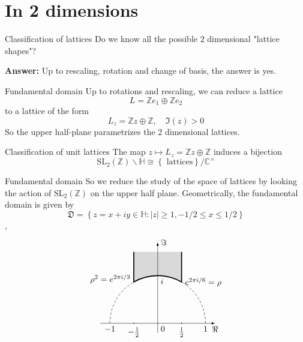 \documentclass[pdf]{beamer}
\begin{document}
\section{In 2 dimensions}
\begin{frame}{Classification of lattices}
    Do we know all the possible 2 dimensional "lattice shapes"?\vspace{3em}

    \pause
    \textbf{Answer:} Up to rescaling, rotation and change of basis, the answer is yes.
\end{frame}
\begin{frame}{Fundamental domain}
    Up to rotations and rescaling, we can reduce a lattice
    \[L = \mathbb{Z}e_1 \oplus \mathbb{Z}e_2\]
    to a lattice of the form
    \[L_z = \mathbb{Z}z\oplus\mathbb{Z}, \quad \Im(z)>0\]
    So the upper half-plane parametrizes the 2 dimensional lattices.
    \begin{block}{Classification of unit lattices}
        The map $z \mapsto L_z = \mathbb{Z}z\oplus\mathbb{Z}$ induces a bijection
        \[\text{SL}_2(\mathbb{Z}) \backslash\mathbb{H} \cong \left\lbrace \text{ lattices}\right\rbrace/\mathbb{C^\times}\]
    \end{block}

\end{frame}
\begin{frame}{Fundamental domain}
    So we reduce the study of the space of lattices by looking the action of $\text{SL}_2(\mathbb{Z})$ on the upper half plane. Geometrically, the fundamental domain is given by
    \[\mathfrak{D} = \left\lbrace z=x+iy \in \mathbb{H}: |z| \ge 1,-1/2 \le x \le 1/2 \right\rbrace \],
    \pause
    \[
        \begin{tikzpicture}[scale=2]
            \draw[densely dashed] (1,0) arc (0:60:1) (-1,0) arc (180:120:1);
            \draw[very thick, fill=gray!30] (.5,1.5) --node[right, pos=1]{$e^{2\pi i/6}=\rho$} (60:1) arc (60:120:1)
            --node[left, pos=.1]{$\rho^2=e^{2\pi i/3}$} (-.5,1.5);
            \draw[-latex] (-1.2,0) -- (1.2,0)node[below]{$\Re$};
            \draw[-latex] (0,-.2) -- (0,1.7)node[right]{$\Im$};
            \path(-1,0) --node[below, pos=0]{$-1$}node[below right, pos=.5]{0}node[below, pos=1]{1} (1,0)
            (0,1)node[below right]{$i$};
            \draw(-.5,.02)--(-.5,-.02)node[below]{$-\frac{1}{2}$}(.5,.02)--(.5,-.02)node[below]{$\frac{1}{2}$};
        \end{tikzpicture}\]
\end{frame}
\end{document}
